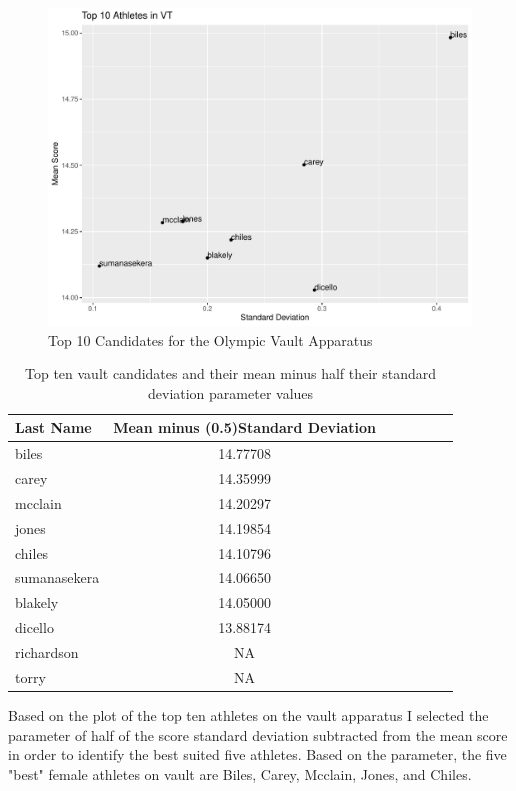 \documentclass[12pt]{article}
\begin{document}
\begin{figure}[tbp]
  \centering
  \includegraphics[scale=0.6]{Top10AthletesVT.pdf}
  \caption{Top 10 Candidates for the Olympic Vault Apparatus}
  \label{fig:VT}
\end{figure}

\begin{table}[tbp]
  \caption{Top ten vault candidates and their mean minus half their standard deviation parameter values}
  \label{tab:tableVTP}
\centering
\begin{tabular}[t]{lccllll}
 \toprule
Last Name & Mean minus (0.5)Standard Deviation\\
\midrule
biles & 14.77708\\
\midrule
carey & 14.35999\\
\midrule
mcclain & 14.20297\\
\midrule
jones & 14.19854\\
\midrule
chiles & 14.10796\\
\midrule
sumanasekera & 14.06650\\
\midrule
blakely & 14.05000\\
\midrule
dicello & 13.88174\\
\midrule
richardson & NA\\
\midrule
torry & NA\\
\bottomrule
\end{tabular}
\end{table}

Based on the plot of the top ten athletes on the vault apparatus I selected the parameter of 
half of the score standard deviation subtracted from the mean score in order to identify the best suited five 
athletes. Based on the parameter, the five "best" female athletes on vault are Biles, Carey, Mcclain, Jones, 
and Chiles.
\end{document}
